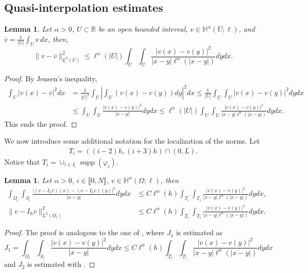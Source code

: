 \documentclass[11 pt]{article}
\newcommand\inter[1]{\llbracket #1\rrbracket}
\newtheorem{lemma}[theorem]{Lemma}
\numberwithin{equation}{section}
\newcommand{\weH}[1]{\mathbb H^{#1}(\Omega;\ell)}
\def\R{\mathbb{R}}
\begin{document}
\subsection{Quasi-interpolation estimates}\label{sec:estimates}

\begin{lemma}\label{lem:poincare_type_weight}
Let $\alpha>0$, $U\subset \R$ be an open bounded interval, $v\in \mathbb H^{\alpha}(U;\ell)$, and $\overline v=\frac{1}{|U|}\int_{U}v\, dx$, then,
%
\begin{equation*}
    \|v-\overline{v}\|_{L^2(U)}^2\leq \ell^{\alpha}(|U|)\int_{U}\int_{U}\frac{|v(x)-v(y)|^2}{|x-y|\ell^{\alpha}(|x-y|)}dy dx.
\end{equation*}
%
\end{lemma}
%
\begin{proof}
By Jensen's inequality,
%
\begin{align*}
    \int_{U}|v(x)-\overline{v}|^2dx
    &=\frac{1}{|U|^2}\int_{U}\left|\int_{U}(v(x)-v(y))dy\right|^2dx \leq \frac{1}{|U|}\int_{U}\int_{U}|v(x)-v(y)|^2dy dx\\
&\leq \int_{U}\int_{U}\frac{|v(x)-v(y)|^2}{|x-y|}dy dx \leq \ell^{\alpha}(|U|)\int_{U}\int_{U}\frac{|v(x)-v(y)|^2}{|x-y|\ell^{\alpha}(|x-y|)}dy dx.
\end{align*}
%
This ends the proof. 
\end{proof}

We now introduce some additional notation for the localization of the norms. Let
\begin{align*}
 T_i=((i-2)h,(i+3)h)\cap(0,L).
 \end{align*}
Notice that $T_i=\cup_{i\in I_i} \operatorname{supp}(\varphi_i)$.


\begin{lemma}\label{lem:stab_dif_interp_weight}
Let $\alpha>0$, $i\in\inter{0,N}$, $v\in \weH{\alpha}$, then
\begin{align}
    \int_{\Omega_i}\int_{S_i}\frac{|(v-I_h v)(x)-(v-I_h v)(y)|^2}{|x-y|}dy dx &\leq C  \ell^{\alpha}(h)\int_{T_i}\int_{T_{i}}\frac{|v(x)-v(y)|^2}{|x-y|\ell^{\alpha}(|x-y|)}dy dx, \label{eq:approxim_estimate_weight}\\
    \|v-I_h v\|_{L^2(\Omega_i)}^2&\leq C\ell^{\alpha}(h)\int_{T_{i}}\int_{T_{i}}\frac{|v(x)-v(y)|^2}{|x-y|\ell^{\alpha}(|x-y|)}dy dx.\label{a4}
\end{align}
\end{lemma}
%
\begin{proof}
 The proof is analogous to the one of , where $J_1$ is estimated as
\begin{equation}\label{eq:est_J1_weight}
    J_1 = \int_{\Omega_i}\int_{S_i}\frac{|v(x)-v(y)|^2}{|x-y|}dy dx \leq C\ell^{\alpha}(h)\int_{T_i}\int_{T_i}\frac{|v(x)-v(y)|^2}{|x-y|\ell^{\alpha}(|x-y|)}dy dx
\end{equation}
and $J_2$ is estimated with .
\end{proof}
\end{document}
